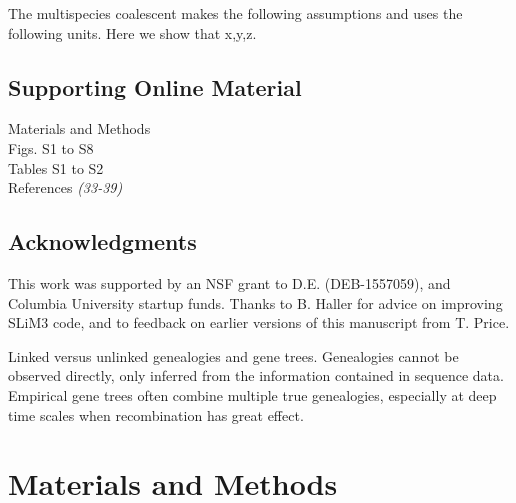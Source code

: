 \documentclass[12pt]{article}
\begin{document}
\newpage

\noindent 
The multispecies coalescent makes the following assumptions and uses
the following units. Here we show that x,y,z.





\subsection*{Supporting Online Material}
Materials and Methods\\
Figs. S1 to S8\\
Tables S1 to S2\\
References \textit{(33-39)}


\subsection*{Acknowledgments}
This work was supported by an NSF grant to D.E. (DEB-1557059), 
and Columbia University startup funds. Thanks to B. Haller for 
advice on improving SLiM3 code, and to feedback on earlier versions
of this manuscript from T. Price.


% 
% 


\clearpage


  Linked versus unlinked genealogies and gene trees. Genealogies cannot be 
  observed directly, only inferred from the information contained in sequence
  data. Empirical gene trees often combine multiple true genealogies, 
  especially at deep time scales when recombination has great effect.
\clearpage






\section*{Materials and Methods}
\end{document}
